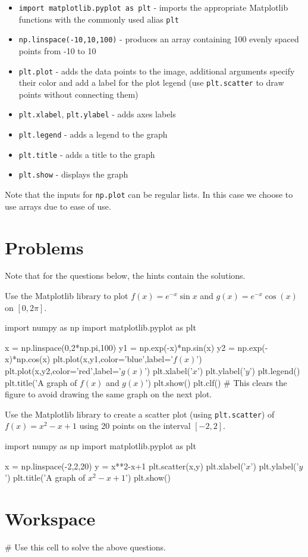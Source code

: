 \documentclass{ximera}
\begin{document}
\begin{itemize}
	\item \verb|import matplotlib.pyplot as plt| - imports the appropriate Matplotlib functions with the commonly used alias \verb|plt|
	\item \verb|np.linspace(-10,10,100)| - produces an array containing 100 evenly spaced points from -10 to 10
	\item \verb|plt.plot| - adds the data points to the image, additional arguments specify their color and add a label for the plot legend (use \verb|plt.scatter| to draw points without connecting them)
	\item \verb|plt.xlabel|, \verb|plt.ylabel| - adds axes labels
	\item \verb|plt.legend| - adds a legend to the graph
	\item \verb|plt.title| - adds a title to the graph
	\item \verb|plt.show| - displays the graph
\end{itemize}

Note that the inputs for \verb|np.plot| can be regular lists. In this case we choose to use arrays due to ease of use.

\section{Problems}

Note that for the questions below, the hints contain the solutions.

\begin{question}
Use the Matplotlib library to plot $f(x)=e^{-x}\sin{x}$ and $g(x)=e^{-x}\cos(x)$ on $[0,2\pi]$.
	\begin{hint}
		\begin{sageCell}
import numpy as np
import matplotlib.pyplot as plt

x = np.linspace(0,2*np.pi,100)
y1 = np.exp(-x)*np.sin(x)
y2 = np.exp(-x)*np.cos(x)
plt.plot(x,y1,color='blue',label='$f(x)$')
plt.plot(x,y2,color='red',label='$g(x)$')
plt.xlabel('$x$')
plt.ylabel('$y$')
plt.legend()
plt.title('A graph of $f(x)$ and $g(x)$')
plt.show()
plt.clf() # This clears the figure to avoid drawing the same graph on the next plot.
\end{sageCell}
	\end{hint}
\end{question}

\begin{question}
	Use the Matplotlib library to create a scatter plot (using \verb|plt.scatter|) of $f(x) =x^2-x+1$ using 20 points on the interval $[-2,2]$.
	
	\begin{hint}
\begin{sageCell}
import numpy as np
import matplotlib.pyplot as plt

x = np.linspace(-2,2,20)
y = x**2-x+1
plt.scatter(x,y)
plt.xlabel('$x$')
plt.ylabel('$y$')
plt.title('A graph of $x^2-x+1$')
plt.show()
\end{sageCell}
	\end{hint}
\end{question}

\section{Workspace}

\begin{sageCell}
# Use this cell to solve the above questions.
\end{sageCell}
\end{document}
